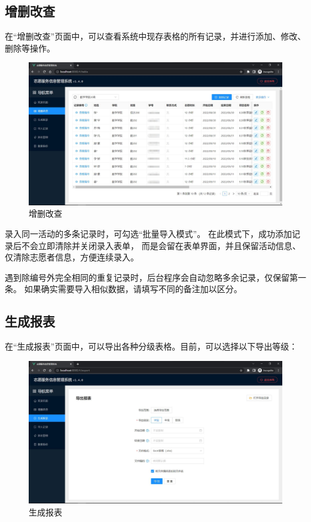 \documentclass[12pt,titlepage]{article}
\begin{document}
\subsection{增删改查}

在“增删改查”页面中，可以查看系统中现存表格的所有记录，并进行添加、修改、删除等操作。

\begin{figure}[htbp]
    \centering
    \includegraphics[width=\textwidth]{../screenshots/table.jpg}
    \caption{增删改查}
\end{figure}

录入同一活动的多条记录时，可勾选“批量导入模式”。
在此模式下，成功添加记录后不会立即清除并关闭录入表单，
而是会留在表单界面，并且保留活动信息、仅清除志愿者信息，方便连续录入。

\begin{warnings}
    \item 遇到除编号外完全相同的重复记录时，后台程序会自动忽略多余记录，仅保留第一条。
    如果确实需要导入相似数据，请填写不同的备注加以区分。
\end{warnings}

\subsection{生成报表}

在“生成报表”页面中，可以导出各种分级表格。目前，可以选择以下导出等级：

\begin{figure}[htbp]
    \centering
    \includegraphics[width=\textwidth]{../screenshots/export.jpg}
    \caption{生成报表}
\end{figure}
\end{document}
